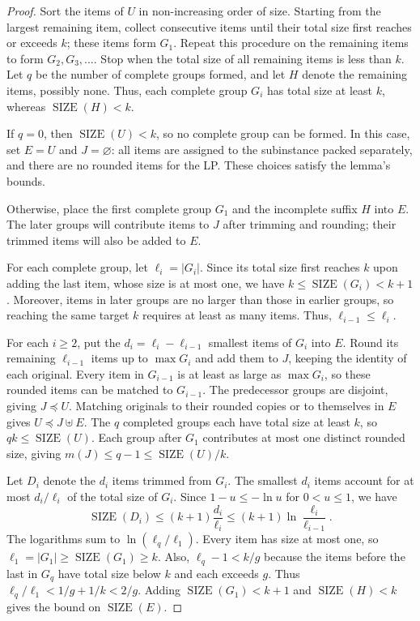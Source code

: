 \documentclass[11pt,a4paper,onecolumn]{article}
\theoremstyle{plain}
\theoremstyle{definition}
\theoremstyle{remark}
\DeclareMathOperator{\SIZE}{SIZE}
\begin{document}
\begin{proof}
Sort the items of $U$ in non-increasing order of size. Starting from
the largest remaining item, collect consecutive items until their total
size first reaches or exceeds $k$; these items form $G_1$. Repeat this
procedure on the remaining items to form $G_2,G_3,\ldots$. Stop when
the total size of all remaining items is less than $k$. Let $q$ be the
number of complete groups formed, and let $H$ denote the remaining
items, possibly none. Thus, each complete group $G_i$ has total size
at least $k$, whereas $\SIZE(H)<k$.

If $q=0$, then $\SIZE(U)<k$, so no complete group can be formed.
In this case, set $E=U$ and $J=\varnothing$: all items are assigned
to the subinstance packed separately, and there are no rounded items
for the LP. These choices satisfy the lemma's bounds.

Otherwise, place the first complete group $G_1$ and the incomplete
suffix $H$ into $E$. The later groups will contribute items to $J$
after trimming and rounding; their trimmed items will also be added
to $E$.

For each complete group, let $\ell_i=|G_i|$. Since its total size first
reaches $k$ upon adding the last item, whose size is at most one, we have
$k\le\SIZE(G_i)<k+1$. Moreover, items in later groups are no larger
than those in earlier groups, so reaching the same target $k$ requires
at least as many items. Thus, $\ell_{i-1}\le\ell_i$.

For each $i\ge 2$, put the $d_i=\ell_i-\ell_{i-1}$ smallest items
of $G_i$ into $E$. Round its remaining $\ell_{i-1}$ items up to
$\max G_i$ and add them to $J$, keeping the identity of each original.
Every item in $G_{i-1}$ is at least as large as $\max G_i$, so these
rounded items can be matched to $G_{i-1}$. The predecessor groups are
disjoint, giving $J\preceq U$. Matching originals to their rounded
copies or to themselves in $E$ gives $U\preceq J\uplus E$.
The $q$ completed groups each have total size at least $k$, so
$qk\le\SIZE(U)$. Each group after $G_1$ contributes at most one
distinct rounded size, giving $m(J)\le q-1\le\SIZE(U)/k$.

Let $D_i$ denote the $d_i$ items trimmed from $G_i$. The smallest
$d_i$ items account for at most $d_i/\ell_i$ of the total size of $G_i$.
Since $1-u\le-\ln u$ for $0<u\le 1$, we have
\[
  \SIZE(D_i)\le (k+1)\frac{d_i}{\ell_i}
  \le (k+1)\ln\frac{\ell_i}{\ell_{i-1}} .
\]
The logarithms sum to $\ln(\ell_q/\ell_1)$. Every item has size at
most one, so $\ell_1=|G_1|\ge\SIZE(G_1)\ge k$. Also, $\ell_q-1<k/g$
because the items before the last in $G_q$ have total size below $k$
and each exceeds $g$. Thus
$\ell_q/\ell_1 < 1/g+1/k < 2/g$.
Adding $\SIZE(G_1)<k+1$ and $\SIZE(H)<k$ gives the bound on $\SIZE(E)$.
\end{proof}
\end{document}
